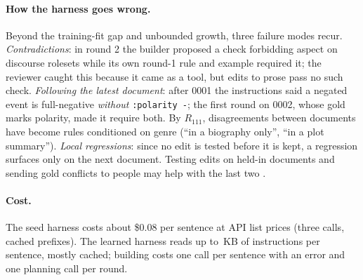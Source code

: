 \paragraph{How the harness goes wrong.}
Beyond the training-fit gap and unbounded growth, three failure modes recur. \emph{Contradictions}: in round 2 the builder proposed a check forbidding aspect on discourse rolesets while its own round-1 rule and example required it; the reviewer caught this because it came as a tool, but edits to prose pass no such check. \emph{Following the latest document}: after 0001 the instructions said a negated event is full-negative \emph{without} \texttt{:polarity -}; the first round on 0002, whose gold marks polarity, made it require both. By $R_{111}$, disagreements between documents have become rules conditioned on genre (``in a biography only'', ``in a plot summary''). \emph{Local regressions}: since no edit is tested before it is kept, a regression surfaces only on the next document. Testing edits on held-in documents \citep{zhang2026self,wang2026do} and sending gold conflicts to people may help with the last two .

\paragraph{Cost.}
The seed harness costs about \$0.08 per sentence at API list prices (three calls, cached prefixes). The learned harness reads up to \sizeLast{}\,KB of instructions per sentence, mostly cached; building costs one call per sentence with an error and one planning call per round. 
